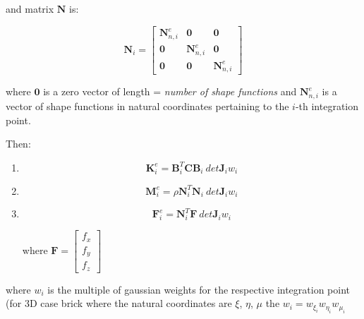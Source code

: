 \documentclass[10pt,b5paper,titlepage]{book}
\begin{document}
\begin{enumerate}
        and matrix $ \mathbf{N} $ is:

        \begin{equation}
            \mathbf{N}_i = \begin{bmatrix}
                \textbf{N}_{n,i}^e & \mathbf{0} & \mathbf{0}\\
                \mathbf{0} & \textbf{N}_{n,i}^e & \mathbf{0}\\
                \mathbf{0} & \mathbf{0} & \textbf{N}_{n,i}^e
            \end{bmatrix}
        \end{equation}

        where $ \mathbf{0} $ is a zero vector of length = \textit{number of shape functions}
        and $ \mathbf{N}_{n,i}^e $ is a vector of shape functions in natural coordinates
        pertaining to the $i$-th integration point.

        Then:

        \begin{enumerate}
            \item \begin{equation}
                    \mathbf{K}_i^e = \mathbf{B}_i^T \mathbf{C} \mathbf{B}_i \ det \mathbf{J}_i
                    w_i
                  \end{equation}

            \item \begin{equation}
                    \mathbf{M}_i^e = \rho \mathbf{N}_i^T \mathbf{N}_i \ det \mathbf{J}_i
                    w_i
                  \end{equation}
            \item \begin{equation}
                    \mathbf{F}_i^e = \mathbf{N}_i^T \mathbf{F} \ det \mathbf{J}_i
                    w_i
                  \end{equation}

                  where $ \mathbf{F} = \begin{bmatrix}f_x \\ f_y \\ f_z\end{bmatrix} $
        \end{enumerate}

        where $ w_i $ is the multiple of gaussian weights for the respective
        integration point (for 3D case brick where the natural coordinates
        are $ \xi $, $ \eta $, $ \mu $ the $ w_i = w_{\xi_i} w_{\eta_i} w_{\mu_i} $


\end{enumerate}
\end{document}
